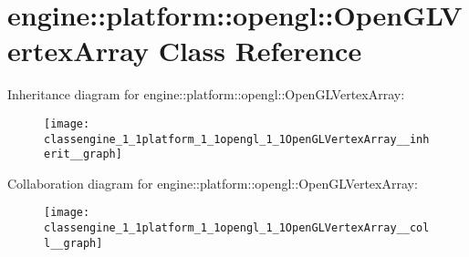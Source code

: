 \hypertarget{classengine_1_1platform_1_1opengl_1_1OpenGLVertexArray}{}\section{engine\+:\+:platform\+:\+:opengl\+:\+:Open\+G\+L\+Vertex\+Array Class Reference}
\label{classengine_1_1platform_1_1opengl_1_1OpenGLVertexArray}


Inheritance diagram for engine\+:\+:platform\+:\+:opengl\+:\+:Open\+G\+L\+Vertex\+Array\+:\nopagebreak
\begin{figure}[H]
\begin{center}
\leavevmode
\texttt{[image: classengine\_1\_1platform\_1\_1opengl\_1\_1OpenGLVertexArray\_\_inherit\_\_graph]}
\end{center}
\end{figure}


Collaboration diagram for engine\+:\+:platform\+:\+:opengl\+:\+:Open\+G\+L\+Vertex\+Array\+:\nopagebreak
\begin{figure}[H]
\begin{center}
\leavevmode
\texttt{[image: classengine\_1\_1platform\_1\_1opengl\_1\_1OpenGLVertexArray\_\_coll\_\_graph]}
\end{center}
\end{figure}
